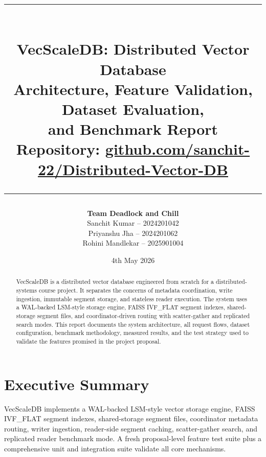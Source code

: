 \documentclass[11pt,a4paper]{article}
\title{%
  \vspace{-1em}%
  {\color{vsblue}\rule{\linewidth}{2pt}}\\[6pt]
  \textbf{\Large VecScaleDB: Distributed Vector Database}\\[4pt]
  \large Architecture, Feature Validation, Dataset Evaluation,\\
  and Benchmark Report\\[4pt]
  \normalsize Repository: \href{https://github.com/sanchit-22/Distributed-Vector-DB}{github.com/sanchit-22/Distributed-Vector-DB}\\[6pt]
  {\color{vsblue}\rule{\linewidth}{0.8pt}}
}
\author{%
  \textbf{Team Deadlock and Chill}\\[4pt]
  Sanchit Kumar -- 2024201042\\
  Priyanshu Jha -- 2024201062\\
  Rohini Mandlekar -- 2025901004
}
\date{4th May 2026}
\begin{document}
\maketitle
\thispagestyle{fancy}

\begin{abstract}
VecScaleDB is a distributed vector database engineered from scratch for a
distributed-systems course project. It separates the concerns of metadata
coordination, write ingestion, immutable segment storage, and stateless reader
execution. The system uses a WAL-backed LSM-style storage engine, FAISS
IVF\_FLAT segment indexes, shared-storage segment files, and coordinator-driven
routing with scatter-gather and replicated search modes. This report documents
the system architecture, all request flows, dataset configuration, benchmark
methodology, measured results, and the test strategy used to validate the
features promised in the project proposal.
\end{abstract}

\tableofcontents
\newpage

\section{Executive Summary}

VecScaleDB implements a WAL-backed LSM-style vector storage engine, FAISS
IVF\_FLAT segment indexes, shared-storage segment files, coordinator metadata
routing, writer ingestion, reader-side segment caching, scatter-gather search,
and replicated reader benchmark mode. A fresh proposal-level feature test suite
plus a comprehensive unit and integration suite validate all core mechanisms.
\end{document}
